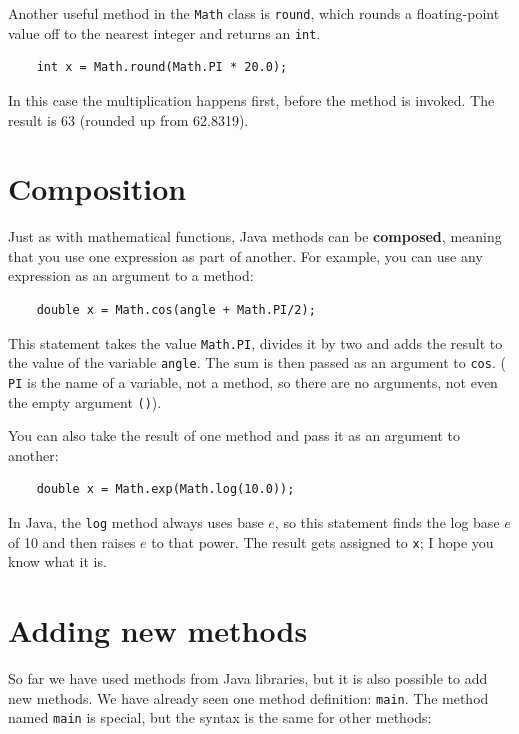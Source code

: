 \documentclass[12pt]{book}
\theoremstyle{exercise}
\begin{document}
Another useful method in the {\tt Math} class is {\tt round},
which rounds a floating-point value off to the nearest integer
and returns an {\tt int}.

\begin{lstlisting}
    int x = Math.round(Math.PI * 20.0);
\end{lstlisting}
%
In this case the multiplication happens first, before the
method is invoked.  The result is 63 (rounded up from 62.8319).


\section {Composition}
\label{composition}

Just as with mathematical functions, Java methods can be {\bf
composed}, meaning that you use one expression as part of another.
For example, you can use any expression as an argument to a method:

\begin{lstlisting}
    double x = Math.cos(angle + Math.PI/2);
\end{lstlisting}
%
This statement takes the value {\tt Math.PI}, divides it by two and
adds the result to the value of the variable {\tt angle}.  The sum is
then passed as an argument to {\tt cos}. ({\tt
PI} is the name of a variable, not a method, so there are no
arguments, not even the empty argument {\tt()}).

You can also take the result of one method and pass it as
an argument to another:

\begin{lstlisting}
    double x = Math.exp(Math.log(10.0));
\end{lstlisting}
%
In Java, the {\tt log} method always uses base $e$, so this
statement finds the log base $e$ of 10 and then raises $e$ to that
power.  The result gets assigned to {\tt x}; I hope you know what it
is.

\section{Adding new methods}
\label{adding_methods}

So far we have used methods from Java libraries,
but it is also possible to add new methods.  We have already
seen one method definition: {\tt main}.  The method named {\tt main}
is special, but the syntax is the same for other methods:
\end{document}
